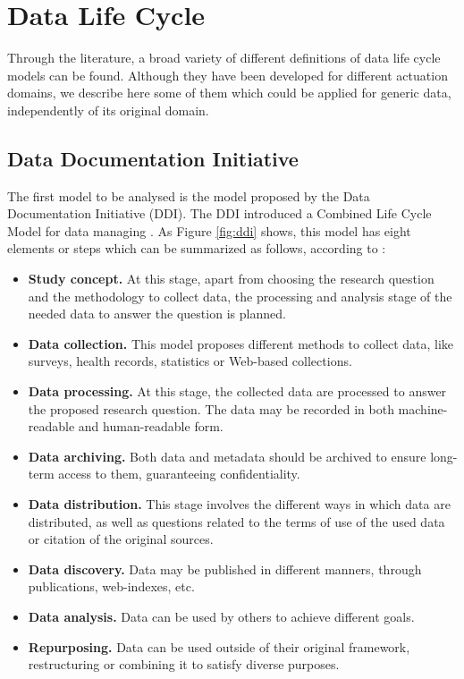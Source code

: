 \section{Data Life Cycle}

Through the literature, a broad variety of different definitions of data life cycle models can be found. Although they have been developed for different actuation domains, we describe here some of them which could be applied for generic data, independently of its original domain.

\subsection{Data Documentation Initiative}

The first model to be analysed is the model proposed by the Data Documentation Initiative (DDI). The DDI introduced a Combined Life Cycle Model for data managing \cite{data_documentation_initiative_overview_2008}. As Figure \ref{fig:ddi} shows, this model has eight elements or steps which can be summarized as follows, according to \cite{ball_review_2012}:

\begin{itemize}
    \item \textbf{Study concept.} At this stage, apart from choosing the research question and the methodology to collect data, the processing and analysis stage of the needed data to answer the question is planned.
    \item \textbf{Data collection.} This model proposes different methods to collect data, like surveys, health records, statistics or Web-based collections.
    \item \textbf{Data processing.} At this stage, the collected data are processed to answer the proposed research question. The data may be recorded in both machine-readable and human-readable form.
    \item \textbf{Data archiving.} Both data and metadata should be archived to ensure long-term access to them, guaranteeing confidentiality.
    \item \textbf{Data distribution.} This stage involves the different ways in which data are distributed, as well as questions related to the terms of use of the used data or citation of the original sources.
    \item \textbf{Data discovery.} Data may be published in different manners, through publications, web-indexes, etc. 
    \item \textbf{Data analysis.} Data can be used by others to achieve different goals. 
    \item \textbf{Repurposing.} Data can be used outside of their original framework, restructuring or combining it to satisfy diverse purposes.
\end{itemize}

